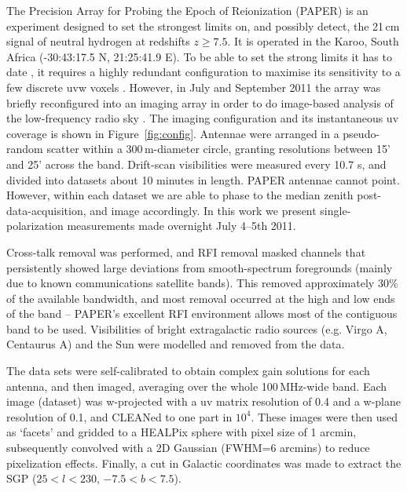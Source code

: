 \documentclass[useAMS,usenatbib]{mn2e}
\begin{document}
The Precision Array for Probing the Epoch of Reionization (PAPER) is an experiment designed to set the strongest limits on, and possibly detect, the 21\,cm signal of neutral hydrogen at redshifts $z \geq 7.5$. It is operated in the Karoo, South Africa (-30:43:17.5 N, 21:25:41.9 E). To be able to set the strong limits it has to date \citep{Parsons.14, Jacobs.14, Ali.15, Moore.15}, it requires a highly redundant configuration to maximise its sensitivity to a few discrete uvw voxels \citep{Parsons.12}. However, in July and September 2011 the array was briefly reconfigured into an imaging array in order to do image-based analysis of the low-frequency radio sky \citep[e.g.][]{Jacobs.11, Stefan.13}. The imaging configuration and its instantaneous uv coverage is shown in Figure~\ref{fig:config}. Antennae were arranged in a pseudo-random scatter within a 300\,m-diameter circle, granting resolutions between 15' and 25' across the band.
Drift-scan visibilities were measured every 10.7 s, and divided into datasets about 10 minutes in length. PAPER antennae cannot point. However, within each dataset we are able to phase to the median zenith post-data-acquisition, and image accordingly. In this work we present single-polarization measurements made overnight July 4--5th 2011.

Cross-talk removal was performed, and RFI removal masked channels that persistently showed large deviations from smooth-spectrum foregrounds (mainly due to known communications satellite bands). This removed approximately 30\% of the available bandwidth, and most removal occurred at the high and low ends of the band -- PAPER's excellent RFI environment allows most of the contiguous band to be used. Visibilities of bright extragalactic radio sources (e.g. Virgo A, Centaurus A) and the Sun were modelled and removed from the data. 

The data sets were self-calibrated to obtain complex gain solutions for each antenna, and then imaged, averaging over the whole 100\,MHz-wide band. Each image (dataset) was w-projected with a uv matrix resolution of 0.4 and a w-plane resolution of 0.1, and CLEANed \citep{Clark.80} to one part in $10^4$. These images were then used as `facets' and gridded to a HEALPix \citep{Gorski.05, Gorski.11} sphere with pixel size of 1 arcmin, subsequently convolved with a 2D Gaussian (FWHM=6 arcmins) to reduce pixelization effects. Finally, a cut in Galactic coordinates was made to extract the SGP ($25<l<230$, $-7.5<b<7.5$).
\end{document}
